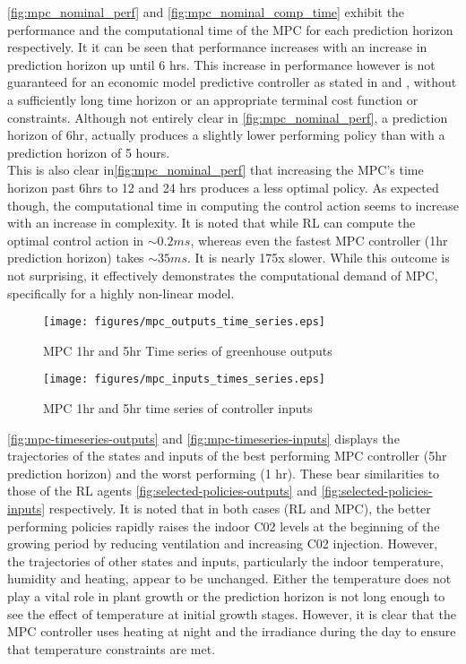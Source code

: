 \autoref{fig:mpc_nominal_perf} and \autoref{fig:mpc_nominal_comp_time} exhibit the performance and the computational time of the MPC for each prediction horizon respectively. It it can be seen that performance increases with an increase in prediction horizon up until 6 hrs. This increase in performance however is not guaranteed for an economic model predictive controller as stated in \cite{ellisTutorialReviewEconomic2014}  and \cite{amritEconomicOptimizationUsing2011}, without a sufficiently long time horizon or an appropriate terminal cost function or constraints. Although not entirely clear in \autoref{fig:mpc_nominal_perf}, a prediction horizon of 6hr, actually produces a slightly lower performing policy than with a prediction horizon of 5 hours. \\
This is also clear in\autoref{fig:mpc_nominal_perf} that increasing the MPC's time horizon past 6hrs to 12 and 24 hrs produces a less optimal policy. As expected though, the computational time in computing the control action seems to increase with an increase in complexity. It is noted that while RL can compute the optimal control action in $ \sim 0.2 ms$, whereas even the fastest MPC controller (1hr prediction horizon) takes $\sim 35 ms$. It is nearly 175x slower.  While this outcome is not surprising, it effectively demonstrates the computational demand of MPC, specifically for a highly non-linear model.

\begin{figure}[h]
	\centering
	\texttt{[image: figures/mpc\_outputs\_time\_series.eps]}
	\caption{MPC 1hr and 5hr Time series of greenhouse outputs}
	\label{fig:mpc-timeseries-outputs}
\end{figure}

\begin{figure}[h]
	\centering
	\texttt{[image: figures/mpc\_inputs\_times\_series.eps]}
	\caption{MPC 1hr and 5hr time series of controller inputs}
	\label{fig:mpc-timeseries-inputs}
\end{figure}

\autoref{fig:mpc-timeseries-outputs} and \autoref{fig:mpc-timeseries-inputs} displays the trajectories of the states and inputs of the best performing MPC controller (5hr prediction horizon) and the worst performing (1 hr). These bear similarities to those of the RL agents \autoref{fig:selected-policies-outputs} and \autoref{fig:selected-policies-inputs} respectively. It is noted that in both cases (RL and MPC), the better performing policies rapidly raises the indoor C02 levels at the beginning of the growing period by reducing ventilation and increasing C02 injection. However, the trajectories of other states and inputs, particularly the indoor temperature, humidity and heating, appear to be unchanged. Either the temperature does not play a vital role in plant growth or the prediction horizon is not long enough to see the effect of temperature at initial growth stages. However, it is clear that the MPC controller uses heating at night and the irradiance during the day to ensure that temperature constraints are met. 


